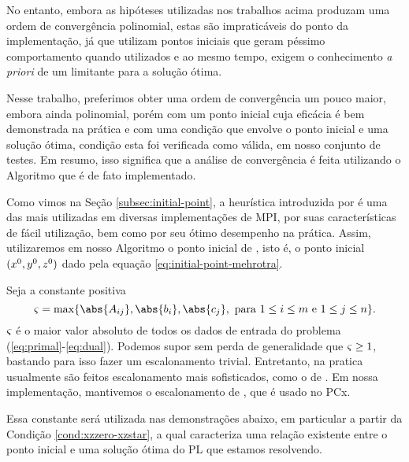No entanto, embora as hipóteses  utilizadas nos trabalhos acima produzam uma ordem de convergência  polinomial, estas são impraticáveis do ponto da implementação, já que utilizam pontos iniciais que geram péssimo comportamento quando utilizados e ao mesmo tempo, exigem o conhecimento \emph{a priori}  de um limitante para a solução  ótima. 

Nesse trabalho, preferimos  obter uma ordem de convergência um pouco maior, embora ainda polinomial, porém com um ponto inicial cuja eficácia é bem demonstrada na prática e com uma condição que envolve o ponto inicial e uma solução ótima, condição esta foi verificada como válida, em nosso conjunto de testes. Em resumo, isso significa que a análise de convergência é feita utilizando o Algoritmo que é de fato implementado.


Como vimos na Seção \ref{subsec:initial-point}, a heurística introduzida por \textcite{Mehrotra:1992wr} é uma das mais utilizadas em diversas implementações de \acl{MPI}, por suas características de fácil utilização, bem como por seu  ótimo desempenho na prática.  Assim,  utilizaremos em nosso Algoritmo o ponto inicial de \citeauthor{Mehrotra:1992wr}, isto é, o ponto inicial $(x^0 ,y^0,z^0 )$  dado pela equação \eqref{eq:initial-point-mehrotra}. 



 Seja a constante positiva 
\begin{equation}
	\label{eq:max-norm-data}
 	\bdxzstar = \max\{\abs{A_{ij}},\abs{b_{i}},\abs{c_{j}}, \text{ para } 1\leq i\leq m \text{ e } 1\leq j \leq n  \}.
\end{equation}
$\varsigma$ é o maior valor absoluto de todos os dados de entrada do problema (\ref{eq:primal}-\ref{eq:dual}). Podemos supor sem perda de generalidade que $\varsigma \geq  1$,  bastando para isso fazer um escalonamento trivial. Entretanto, na pratica usualmente são feitos escalonamento mais sofisticados, como o de \textcite{Curtis:1972cp}. Em nossa implementação, mantivemos o escalonamento de \citeauthor{Curtis:1972cp}, que é  usado no PCx.

Essa constante será utilizada nas demonstrações abaixo, em particular a partir da Condição \ref{cond:xzzero-xzstar}, a qual caracteriza uma relação existente entre  o ponto inicial e uma solução ótima do \ac{PL} que estamos resolvendo. 


